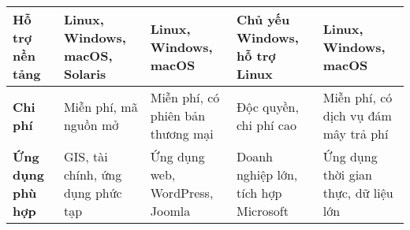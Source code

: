 \begin{enumerate}[(a)]
\begin{landscape}
\begin{longtable}{|p{3.5cm}|p{4cm}|p{4cm}|p{4cm}|p{4cm}|}
			      \hline
			      \textbf{Hỗ trợ nền tảng}           & Linux, Windows, macOS, Solaris                                    & Linux, Windows, macOS                   & Chủ yếu Windows, hỗ trợ Linux                   & Linux, Windows, macOS                       \\
			      \hline
			      \textbf{Chi phí}                   & Miễn phí, mã nguồn mở                                             & Miễn phí, có phiên bản thương mại       & Độc quyền, chi phí cao                          & Miễn phí, có dịch vụ đám mây trả phí        \\
			      \hline
			      \textbf{Ứng dụng phù hợp}          & GIS, tài chính, ứng dụng phức tạp                                 & Ứng dụng web, WordPress, Joomla         & Doanh nghiệp lớn, tích hợp Microsoft            & Ứng dụng thời gian thực, dữ liệu lớn        \\
			      \hline
		      \end{longtable}
	      \end{landscape}

\end{enumerate}
